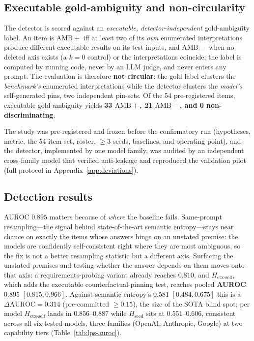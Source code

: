 \documentclass[acmsmall,screen,nonacm]{acmart}
\newcommand{\Hseed}{\ensuremath{H_{\mathrm{seed}}}}
\newcommand{\Hctx}{\ensuremath{H_{\text{ctx-self}}}}
\begin{document}
\subsection{Executable gold-ambiguity and non-circularity}
\label{sec:study2-gold}
The detector is scored against an \emph{executable, detector-independent} gold-ambiguity label. An item
is $\mathrm{AMB}{+}$ iff at least two of its \emph{own} enumerated interpretations produce different
executable results on its test inputs, and $\mathrm{AMB}{-}$ when no deleted axis exists (a $k{=}0$ control)
or the interpretations coincide; the label is computed by running code, never by an LLM judge, and
never enters any prompt. The evaluation is therefore \textbf{not circular}: the gold label clusters the
\emph{benchmark's} enumerated interpretations while the detector clusters the \emph{model's} self-generated
pins, two independent pin-sets. Of the 54
pre-registered items, executable gold-ambiguity yields \textbf{33 $\mathrm{AMB}{+}$, 21 $\mathrm{AMB}{-}$,
and 0 non-discriminating}.

The study was pre-registered and frozen before the confirmatory run (hypotheses, metric, the 54-item set,
roster, $\ge 3$ seeds, baselines, and operating point), and the detector, implemented by one model family,
was audited by an independent cross-family model that verified anti-leakage and reproduced the validation
pilot (full protocol in Appendix~\ref{app:deviations}).

\subsection{Detection results}
\label{sec:study2-results}
AUROC $0.895$ matters because of \emph{where} the baseline fails. Same-prompt resampling---the signal
behind state-of-the-art semantic entropy---stays near chance on exactly the items whose answers hinge on an
unstated premise: the models are confidently self-consistent right where they are most ambiguous, so the
fix is not a better resampling statistic but a different axis. Surfacing the unstated premises and testing
whether the answer depends on them moves onto that axis: a requirements-probing variant already reaches
$0.810$, and \Hctx{}, which adds the executable counterfactual-pinning test, reaches pooled
\textbf{AUROC $0.895$} $[0.815, 0.966]$. Against semantic entropy's \textbf{$0.581$} $[0.484, 0.675]$ this is
a $\Delta\mathrm{AUROC} = 0.314$ (pre-committed $\ge 0.15$), the size of the SOTA blind spot; per model
\Hctx{} lands in $0.856$--$0.887$ while \Hseed{} sits at $0.551$--$0.606$, consistent across all six tested
models, three families (OpenAI, Anthropic, Google) at two capability tiers (Table~\ref{tab:lps-auroc}).
\end{document}
